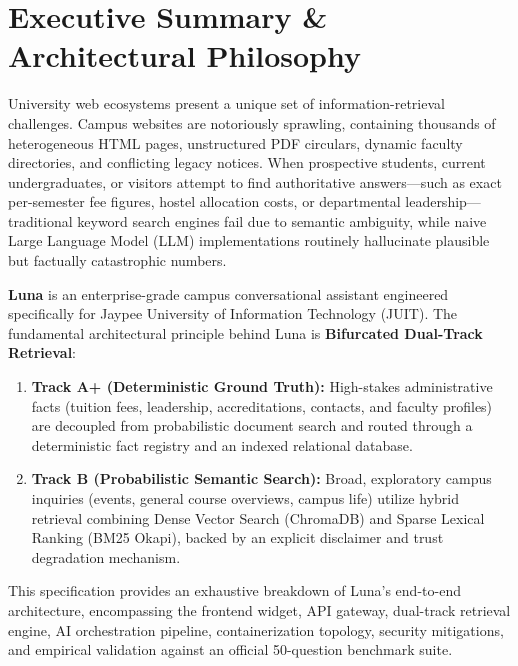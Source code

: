 \documentclass[11pt,a4paper]{article}
\begin{document}
\newpage
\tableofcontents
\newpage

\section{Executive Summary \& Architectural Philosophy}

University web ecosystems present a unique set of information-retrieval challenges. Campus websites are notoriously sprawling, containing thousands of heterogeneous HTML pages, unstructured PDF circulars, dynamic faculty directories, and conflicting legacy notices. When prospective students, current undergraduates, or visitors attempt to find authoritative answers---such as exact per-semester fee figures, hostel allocation costs, or departmental leadership---traditional keyword search engines fail due to semantic ambiguity, while naive Large Language Model (LLM) implementations routinely hallucinate plausible but factually catastrophic numbers.

\textbf{Luna} is an enterprise-grade campus conversational assistant engineered specifically for Jaypee University of Information Technology (JUIT). The fundamental architectural principle behind Luna is \textbf{Bifurcated Dual-Track Retrieval}:
\begin{enumerate}
    \item \textbf{Track A+ (Deterministic Ground Truth):} High-stakes administrative facts (tuition fees, leadership, accreditations, contacts, and faculty profiles) are decoupled from probabilistic document search and routed through a deterministic fact registry and an indexed relational database.
    \item \textbf{Track B (Probabilistic Semantic Search):} Broad, exploratory campus inquiries (events, general course overviews, campus life) utilize hybrid retrieval combining Dense Vector Search (ChromaDB) and Sparse Lexical Ranking (BM25 Okapi), backed by an explicit disclaimer and trust degradation mechanism.
\end{enumerate}

This specification provides an exhaustive breakdown of Luna's end-to-end architecture, encompassing the frontend widget, API gateway, dual-track retrieval engine, AI orchestration pipeline, containerization topology, security mitigations, and empirical validation against an official 50-question benchmark suite.
\end{document}
